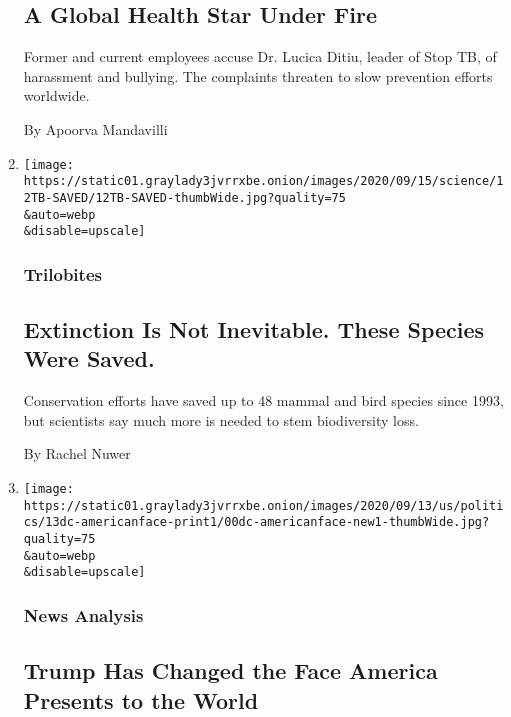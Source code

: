 \begin{enumerate}
  \hypertarget{a-global-health-star-under-fire}{%
  \subsection{A Global Health Star Under
  Fire}\label{a-global-health-star-under-fire}}

  Former and current employees accuse Dr. Lucica Ditiu, leader of Stop
  TB, of harassment and bullying. The complaints threaten to slow
  prevention efforts worldwide.

  By Apoorva Mandavilli
\item
  \href{/2020/09/12/science/extinction-species-conservation.html}{}

  \texttt{[image: https://static01.graylady3jvrrxbe.onion/images/2020/09/15/science/12TB-SAVED/12TB-SAVED-thumbWide.jpg?quality=75\\\&auto=webp\\\&disable=upscale]}

  \hypertarget{trilobites}{%
  \subsubsection{Trilobites}\label{trilobites}}

  \hypertarget{extinction-is-not-inevitable-these-species-were-saved}{%
  \subsection{Extinction Is Not Inevitable. These Species Were
  Saved.}\label{extinction-is-not-inevitable-these-species-were-saved}}

  Conservation efforts have saved up to 48 mammal and bird species since
  1993, but scientists say much more is needed to stem biodiversity
  loss.

  By Rachel Nuwer
\item
  \href{/2020/09/12/us/politics/trump-race-state-department.html}{}

  \texttt{[image: https://static01.graylady3jvrrxbe.onion/images/2020/09/13/us/politics/13dc-americanface-print1/00dc-americanface-new1-thumbWide.jpg?quality=75\\\&auto=webp\\\&disable=upscale]}

  \hypertarget{news-analysis-1}{%
  \subsubsection{News Analysis}\label{news-analysis-1}}

  \hypertarget{trump-has-changed-the-face-america-presents-to-the-world}{%
  \subsection{Trump Has Changed the Face America Presents to the
  World}\label{trump-has-changed-the-face-america-presents-to-the-world}}


\end{enumerate}

